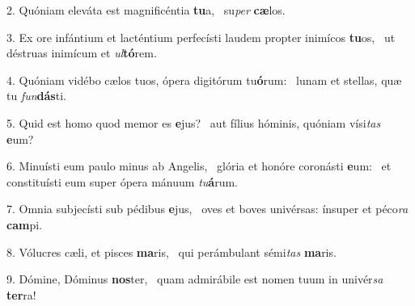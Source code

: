 2. Quóniam eleváta est magnificéntia \textbf{tu}a, \ast\  su\textit{per} \textbf{cæ}los.\

3. Ex ore infántium et lacténtium perfecísti laudem propter inimícos \textbf{tu}os, \ast\  ut déstruas inimícum et \textit{ul}\textbf{tó}rem.\

4. Quóniam vidébo cælos tuos, ópera digitórum tu\textbf{ó}rum: \ast\  lunam et stellas, quæ tu \textit{fun}\textbf{dás}ti.\

5. Quid est homo quod memor es \textbf{e}jus? \ast\  aut fílius hóminis, quóniam vísi\textit{tas} \textbf{e}um?\

6. Minuísti eum paulo minus ab Angelis, \dag\  glória et honóre coronásti \textbf{e}um: \ast\  et constituísti eum super ópera mánuum \textit{tu}\textbf{á}rum.\

7. Omnia subjecísti sub pédibus \textbf{e}jus, \ast\  oves et boves univérsas: ínsuper et péco\textit{ra} \textbf{cam}pi.\

8. Vólucres cæli, et pisces \textbf{ma}ris, \ast\  qui perámbulant sémi\textit{tas} \textbf{ma}ris.\

9. Dómine, Dóminus \textbf{nos}ter, \ast\  quam admirábile est nomen tuum in univér\textit{sa} \textbf{ter}ra!\

